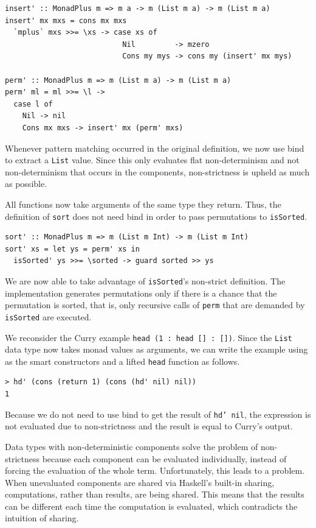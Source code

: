 \documentclass[a4paper, 11pt, fleqn, twoside]{scrreprt}
\newcommand{\hinl}[1]{\texttt{#1}}
\begin{document}
\begin{verbatim}
insert' :: MonadPlus m => m a -> m (List m a) -> m (List m a)
insert' mx mxs = cons mx mxs
  `mplus` mxs >>= \xs -> case xs of
                           Nil         -> mzero
                           Cons my mys -> cons my (insert' mx mys)

perm' :: MonadPlus m => m (List m a) -> m (List m a)
perm' ml = ml >>= \l ->
  case l of
    Nil -> nil
    Cons mx mxs -> insert' mx (perm' mxs)
\end{verbatim}

Whenever pattern matching occurred in the original definition, we now use bind 
to extract a \hinl{List} value. Since this only evaluates flat 
non-determinism and not non-determinism that occurs in the components, 
non-strictness is upheld as much as possible. 

All functions now take arguments of the same type they return. Thus, the 
definition of \hinl{sort} does not need bind in order to pass 
permutations to \hinl{isSorted}.

\begin{verbatim}
sort' :: MonadPlus m => m (List m Int) -> m (List m Int)
sort' xs = let ys = perm' xs in
  isSorted' ys >>= \sorted -> guard sorted >> ys
\end{verbatim}

We are now able to take advantage of \hinl{isSorted}'s non-strict
definition. The implementation generates permutations only if there is a chance 
that the permutation is sorted, that is, only recursive calls of 
\hinl{perm} that are demanded by \hinl{isSorted} are executed.

We reconsider the Curry example \hinl{head (1 : head [] : [])}. Since the 
\hinl{List} data type now takes monad values as arguments, we can write the 
example using as the smart constructors and a lifted \hinl{head} function as 
follows.

\begin{verbatim}
> hd' (cons (return 1) (cons (hd' nil) nil))
1
\end{verbatim}

Because we do not need to use bind to get the result of \hinl{hd' nil}, the 
expression is not evaluated due to non-strictness and the result is equal to 
Curry's output.

Data types with non-deterministic components solve the problem of 
non-strictness because each component can be evaluated individually, instead of 
forcing the evaluation of the whole term. Unfortunately, this leads to a 
problem. When unevaluated components are shared via Haskell's built-in sharing, 
computations, rather than results, are being shared. This means that the 
results can be different each time the computation is evaluated, which 
contradicts the intuition of sharing.
\end{document}
